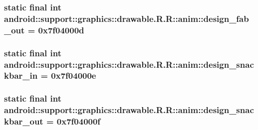 \hypertarget{classandroid_1_1support_1_1graphics_1_1drawable_1_1_r_1_1anim_dc8c930fbee0bd02e51394393611ffb1}{
\subsubsection[{design\_\-fab\_\-out}]{\setlength{\rightskip}{0pt plus 5cm}static final int android::support::graphics::drawable.R.R::anim::design\_\-fab\_\-out = 0x7f04000d}}
\label{classandroid_1_1support_1_1graphics_1_1drawable_1_1_r_1_1anim_dc8c930fbee0bd02e51394393611ffb1}


\hypertarget{classandroid_1_1support_1_1graphics_1_1drawable_1_1_r_1_1anim_05d5e7f1402121760cf85dd161d2c73d}{
\subsubsection[{design\_\-snackbar\_\-in}]{\setlength{\rightskip}{0pt plus 5cm}static final int android::support::graphics::drawable.R.R::anim::design\_\-snackbar\_\-in = 0x7f04000e}}
\label{classandroid_1_1support_1_1graphics_1_1drawable_1_1_r_1_1anim_05d5e7f1402121760cf85dd161d2c73d}


\hypertarget{classandroid_1_1support_1_1graphics_1_1drawable_1_1_r_1_1anim_17f1b69c89ba3a08d8d21985187d4e03}{
\subsubsection[{design\_\-snackbar\_\-out}]{\setlength{\rightskip}{0pt plus 5cm}static final int android::support::graphics::drawable.R.R::anim::design\_\-snackbar\_\-out = 0x7f04000f}}
\label{classandroid_1_1support_1_1graphics_1_1drawable_1_1_r_1_1anim_17f1b69c89ba3a08d8d21985187d4e03}




